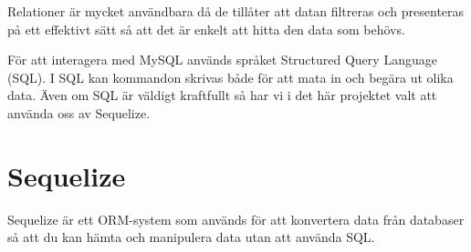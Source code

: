 Relationer är mycket användbara då de tillåter att datan filtreras och presenteras på ett effektivt sätt så att det är enkelt att hitta den data som behövs.

För att interagera med MySQL används språket Structured Query Language (SQL). I SQL kan kommandon skrivas både för att mata in och begära ut olika data. Även om SQL är väldigt kraftfullt så har vi i det här projektet valt att använda oss av Sequelize.


\section{Sequelize}
Sequelize är ett ORM-system som används för att konvertera data från databaser så att du kan hämta och manipulera data utan att använda SQL.
\cite{sequelize}
